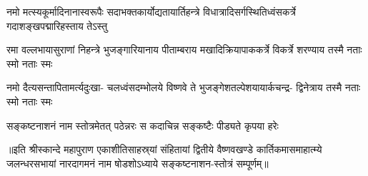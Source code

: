 

\uvacha{[देवा ऊचुः]}

\fourlineindentedshloka
{नमो मत्स्यकूर्मादिनानास्वरूपैः}
{सदाभक्तकार्योद्यतायार्तिहन्त्रे}
{विधात्रादिसर्गस्थितिध्वंसकर्त्रे}
{गदाशङ्खपद्मारिहस्ताय तेऽस्तु} %

\fourlineindentedshloka
{रमा वल्लभायासुराणां निहन्त्रे}
{भुजङ्गारियानाय पीताम्बराय}
{मखादिक्रियापाककर्त्रे विकर्त्रे}
{शरण्याय तस्मै नताः स्मो नताः स्मः} %

\fourlineindentedshloka
{नमो दैत्यसन्तापितामर्त्यदुःखा-}
{चलध्वंसदम्भोलये विष्णवे ते}
{भुजङ्गेशतल्पेशयायार्कचन्द्र-}
{द्विनेत्राय तस्मै नताः स्मो नताः स्मः} %


\twolineshloka
{सङ्कष्टनाशनं नाम स्तोत्रमेतत् पठेन्नरः}
{स कदाचिन्न सङ्कष्टैः पीड्यते कृपया हरेः} %

॥इति श्रीस्कान्दे महापुराण एकाशीतिसाहस्र्यां संहितायां द्वितीये वैष्णवखण्डे कार्तिकमासमाहात्म्ये जलन्धरसभायां नारदागमनं नाम षोडशोऽध्याये सङ्कष्टनाशन-स्तोत्रं सम्पूर्णम्॥